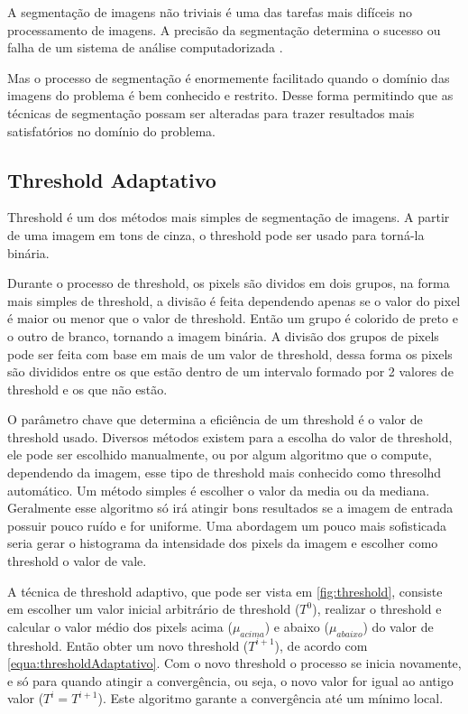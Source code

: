 A segmentação de imagens não triviais é uma das tarefas mais difíceis no processamento de imagens. A precisão da segmentação determina o sucesso ou falha de um sistema de análise computadorizada \cite{gonzalez}.

Mas o processo de segmentação é enormemente facilitado quando o domínio das imagens do problema é bem conhecido e restrito. Desse forma permitindo que as técnicas de segmentação possam ser alteradas para trazer resultados mais satisfatórios no domínio do problema.

\subsection{Threshold Adaptativo}
\label{subsec:threshold}

Threshold é um dos métodos mais simples de segmentação de imagens. A partir de uma imagem em tons de cinza, o threshold pode ser usado para torná-la binária.

Durante o processo de threshold, os pixels são dividos em dois grupos, na forma mais simples de threshold, a divisão é feita dependendo apenas se o valor do pixel é maior ou menor que o valor de threshold. Então um grupo é colorido de preto e o outro de branco, tornando a imagem binária. A divisão dos grupos de pixels pode ser feita com base em mais de um valor de threshold, dessa forma os pixels são divididos entre os que estão dentro de um intervalo formado por 2 valores de threshold e os que não estão.

O parâmetro chave que determina a eficiência de um threshold é o valor de threshold usado. Diversos métodos existem para a escolha do valor de threshold, ele pode ser escolhido manualmente, ou por algum algoritmo que o compute, dependendo da imagem, esse tipo de threshold mais conhecido como thresolhd automático. Um método simples é escolher o valor da media ou da mediana. Geralmente esse algoritmo só irá atingir bons resultados se a imagem de entrada possuir pouco ruído e for uniforme. Uma abordagem um pouco mais sofisticada seria gerar o histograma da intensidade dos pixels da imagem e escolher como threshold o valor de vale.

A técnica de threshold adaptivo, que pode ser vista em \ref{fig:threshold}, consiste em escolher um valor inicial arbitrário de threshold ($T^0$), realizar o threshold e calcular o valor médio dos pixels acima ($\mu_{acima}$) e abaixo ($\mu_{abaixo}$) do valor de threshold. Então obter um novo threshold ($T^{i+1}$), de acordo com \ref{equa:thresholdAdaptativo}. Com o novo threshold o processo se inicia novamente, e só para quando atingir a convergência, ou seja, o novo valor for igual ao antigo valor ($T^i = T^{i+1}$). Este algoritmo garante a convergência até um mínimo local.

